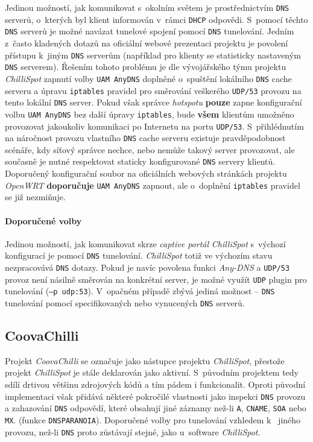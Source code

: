 \documentclass[thesis=M,czech]{FITthesis}[2012/10/20]
\begin{document}
Jedinou možností, jak komunikovat s~okolním světem je prostřednictvím \texttt{DNS} serverů, o~kterých byl klient informován v~rámci \texttt{DHCP} odpovědi. S~pomocí těchto \texttt{DNS} serverů je možné navázat tunelové spojení pomocí \texttt{DNS} tunelování. Jedním z~často kladených dotazů na oficiální webové prezentaci projektu\cite{chillispot-faq} je povolení přístupu k~jiným \texttt{DNS} serverům (například pro klienty se statisticky nastaveným \texttt{DNS} serverem). Řešením tohoto problému je dle vývojářského týmu projektu \textit{ChilliSpot} zapnutí volby \texttt{UAM AnyDNS} doplněné o~spuštění lokálního \texttt{DNS} cache serveru a úpravu \texttt{iptables} pravidel pro směrování veškerého \texttt{UDP/53} provozu na tento lokální \texttt{DNS} server. Pokud však správce \textit{hotspotu} \textbf{pouze} zapne konfigurační volbu \texttt{UAM AnyDNS} bez další úpravy \texttt{iptables}, bude \textbf{všem} klientům umožněno provozovat jakoukoliv komunikaci po Internetu na portu \texttt{UDP/53}. S~přihlédnutím na náročnost provozu vlastního \texttt{DNS} cache serveru existuje pravděpodobnost scénáře, kdy síťový správce nechce, nebo nemůže takový server provozovat, ale současně je nutné respektovat staticky konfigurované \texttt{DNS} servery klientů. Doporučený konfigurační soubor na oficiálních webových stránkách projektu \textit{OpenWRT} \textbf{doporučuje} \texttt{UAM AnyDNS} zapnout, ale o~doplnění \texttt{iptables} pravidel se již nezmiňuje\cite{chillispot-openwrt}. 

\paragraph{Doporučené volby} Jedinou možností, jak komunikovat skrze \textit{captive portál} \textit{ChilliSpot} s~výchozí konfigurací je pomocí \texttt{DNS} tunelování. \textit{ChilliSpot} totiž ve výchozím stavu nezpracovává \texttt{DNS} dotazy. Pokud je navíc povolena funkci \textit{Any-DNS} a \texttt{UDP/53} provoz není násilně směrován na konkrétní server, je možné využít \texttt{UDP} plugin pro tunelování (\texttt{--p udp:53}). V~opačném případě zbývá jediná možnost -- \texttt{DNS} tunelování pomocí specifikovaných nebo vynucených \texttt{DNS} serverů.


\subsection{CoovaChilli}

Projekt \textit{CoovaChilli} se označuje jako nástupce projektu \textit{ChilliSpot}, přestože projekt \textit{ChilliSpot} je stále deklarován jako aktivní. S~původním projektem tedy sdílí drtivou většinu zdrojových kódů a tím pádem i funkcionalit. Oproti původní implementaci však přidává některé pokročilé vlastnosti jako inspekci \texttt{DNS} provozu a zahazování \texttt{DNS} odpovědí, které obsahují jiné záznamy než-li \texttt{A}, \texttt{CNAME}, \texttt{SOA} nebo \texttt{MX}. (funkce \texttt{DNSPARANOIA}). Doporučené volby pro tunelování vzhledem k~ jiného provozu, než-li \texttt{DNS} proto zůstávají stejné, jako u~software \textit{ChilliSpot}.
    
\end{document}
